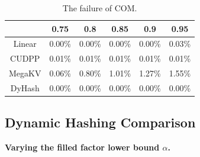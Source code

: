 \begin{table}[H]
	\caption{The failure of COM.}
	\centering
	\begin{tabular}{|c|c|c|c|c|c|}
		\hline
		& 0.75 & 0.8 & 0.85 & 0.9 & 0.95\\ \hline
		Linear &0.00\% & 0.00\% &0.00\%  & 0.00\% & 0.03\% \\ \hline
		CUDPP & 0.01\% & 0.01\% &0.01\%  & 0.01\% & 0.01\% \\ \hline
		MegaKV & 0.06\% & 0.80\% &1.01\%  & 1.27\% & 1.55\% \\ \hline
		DyHash &0.00\% & 0.00\% &0.00\%  & 0.00\% & 0.00\% \\ \hline
	\end{tabular}
	\label{tab:fail:com}
\end{table}


\subsection{Dynamic Hashing Comparison}\label{sec:exp:dynamic}

\vspace{1mm}\noindent\textbf{Varying the filled factor lower bound $\alpha$.}

